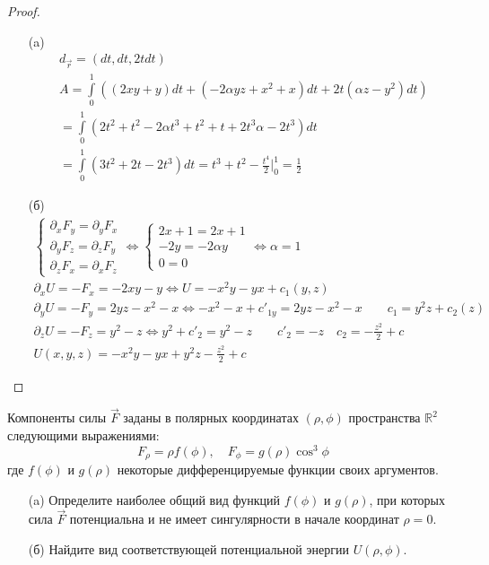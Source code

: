 \begin{proof}
\begin{itemize}
\item[]
\item[(a)]
    \begin{gather*}
        d_{\vec{r}} = \left(dt, dt, 2tdt\right)\\
        A = \int\limits_{0}^{1} \left(\left(2xy+y\right)dt + \left(-2\alpha yz + x^2 + x\right)dt + 2t\left(\alpha z - y^2\right)dt\right)\\
        = \int\limits_{0}^{1} \left(2t^2 + t^2 - 2 \alpha t^3 + t^2 + t + 2 t^3 \alpha - 2t^3\right)dt\\
        = \int\limits_{0}^{1} \left(3t^2 + 2t - 2t^3\right)dt
        = t^3 + t^2 - \frac{t^4}{2} \bigg|_{0}^{1}
        = \frac{1}{2}
    \end{gather*}
\item[(б)]
    \begin{gather*}
        \begin{cases}
            \partial_x F_y = \partial_y F_x\\
            \partial_y F_z = \partial_z F_y\\
            \partial_z F_x = \partial_x F_z
        \end{cases}
        \Leftrightarrow
        \begin{cases}
            2x + 1 = 2x + 1\\
            -2y = -2\alpha y\\
            0 = 0
        \end{cases}
        \Leftrightarrow
        \alpha = 1\\
        \partial_x U = -F_x = -2xy - y \Leftrightarrow
        U = -x^2 y - yx + c_1\left(y,z\right)\\
        \partial_y U = -F_y = 2yz - x^2 - x  \Leftrightarrow
        -x^2 - x + c'_{1y} = 2yz - x^2 - x\qquad
        c_1 = y^2 z + c_2\left(z\right)\\
        \partial_z U = -F_z = y^2 - z \Leftrightarrow
        y^2 + c'_2 = y^2 - z\qquad c'_2 = -z\quad c_2 = -\frac{z^2}{2} + c\\
        U\left(x,y,z\right) = -x^2 y - y x + y^2 z - \frac{z^2}{2} + c
    \end{gather*}
\end{itemize}
\end{proof}
\vskip 0.6in




\begin{prob}
Компоненты силы $\vec{F}$ заданы в полярных координатах $(\rho, \phi)$ пространства $\mathbb{R}^2$ следующими выражениями:
$$
F_\rho=\rho f(\phi), \quad F_\phi=g(\rho) \cos ^3 \phi
$$
где $f(\phi)$ и $g(\rho)$ некоторые дифференцируемые функции своих аргументов.
\begin{itemize}
\item[(a)] Определите наиболее общий вид функций $f(\phi)$ и $g(\rho)$, при которых сила $\vec{F}$ потенциальна и не имеет сингулярности в начале координат $\rho=0$.
\item[(б)] Найдите вид соответствующей потенциальной энергии $U(\rho, \phi)$.
\end{itemize}
\end{prob}

